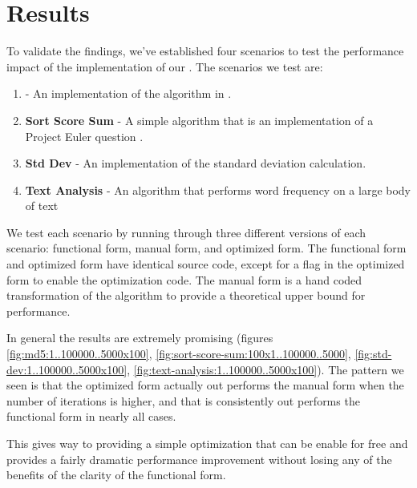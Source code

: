 \section{Results}
To validate the findings, we've established four scenarios to test the performance impact of the implementation of our \algorithm. The scenarios we test are:
\begin{enumerate}
  \item \textbf{\mdfive} - An implementation of the \mdfive\cite{mdfive92} algorithm in \javascript.
  \item \textbf{Sort Score Sum} - A simple algorithm that is an implementation of a Project Euler question \cite{euler05}.
  \item \textbf{Std Dev} - An implementation of the standard deviation calculation.
  \item \textbf{Text Analysis} - An algorithm that performs word frequency on a large body of text   
\end{enumerate}

We test each scenario by running through three different versions of each scenario: functional form, manual form, and optimized form.  The functional form and optimized form have identical source code, except for a flag in the optimized form to enable the optimization code.  The manual form is a hand coded transformation of the algorithm to provide a theoretical upper bound for performance.

In general the results are extremely promising (figures \ref{fig:md5:1..100000..5000x100}, \ref{fig:sort-score-sum:100x1..100000..5000}, \ref{fig:std-dev:1..100000..5000x100}, \ref{fig:text-analysis:1..100000..5000x100}). The pattern we seen is that the optimized form actually out performs the manual form when the number of iterations is higher, and that is consistently out performs the functional form in nearly all cases.

This gives way to providing a simple optimization that can be enable for free and provides a fairly dramatic performance improvement without losing any of the benefits of the clarity of the functional form. 